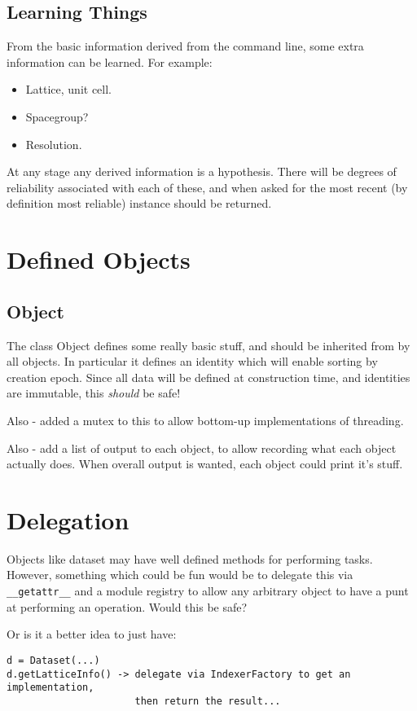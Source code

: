 \documentclass[a4paper, 11pt]{article}
\begin{document}
\subsection{Learning Things}

From the basic information derived from the command line, some extra 
information can be learned. For example:

\begin{itemize}
\item{Lattice, unit cell.}
\item{Spacegroup?}
\item{Resolution.}
\end{itemize}

At any stage any derived information is a hypothesis. There will be degrees
of reliability associated with each of these, and when asked for the most 
recent (by definition most reliable) instance should be returned.

\section{Defined Objects}

\subsection{Object}

The class Object defines some really basic stuff, and should be inherited 
from by all objects. In particular it defines an identity which will enable
sorting by creation epoch. Since all data will be defined at construction 
time, and identities are immutable, this \emph{should} be safe!

Also - added a mutex to this to allow bottom-up implementations of threading.

Also - add a list of output to each object, to allow recording what each
object actually does. When overall output is wanted, each object could print
it's stuff.

\section{Delegation}

Objects like dataset may have well defined methods for performing tasks.
However, something which could be fun would be to delegate this via
\verb|__getattr__| and a module registry to allow any arbitrary object to
have a punt at performing an operation. Would this be safe?

Or is it a better idea to just have:

{
\tiny
\begin{verbatim}
d = Dataset(...)
d.getLatticeInfo() -> delegate via IndexerFactory to get an implementation,
                      then return the result...
\end{verbatim}
}
\end{document}
